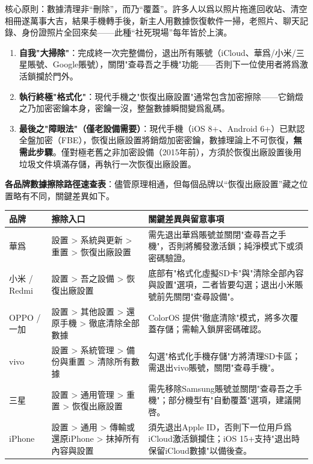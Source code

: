 


核心原則：數據清理非“刪除”，而乃“覆蓋”。許多人以爲以照片拖進回收站、清空相冊遂萬事大吉，結果手機轉手後，新主人用數據恢復軟件一掃，老照片、聊天記錄、身份證照片全回來矣——此種“社死現場”每年皆於上演。

\begin{enumerate}
  \item \textbf{自我"大掃除"}：完成終一次完整備份，退出所有賬號（iCloud、華爲/小米/三星賬號、Google賬號），關閉"查尋吾之手機"功能——否則下一位使用者將爲激活鎖攔於門外。
  \item \textbf{執行終極"格式化"}：現代手機之"恢復出廠設置"通常包含加密擦除——它銷燬之乃加密密鑰本身，密鑰一沒，整盤數據瞬間變爲亂碼。
  \item \textbf{最後之"障眼法"（僅老設備需要）}：現代手機（iOS 8+、Android 6+）已默認全盤加密（FBE），恢復出廠設置將銷燬加密密鑰，數據理論上不可恢復，\textbf{無需此步驟}。僅對極老舊之非加密設備（2015年前），方須於恢復出廠設置後用垃圾文件填滿存儲，再執行一次恢復出廠設置。
\end{enumerate}

\textbf{各品牌數據擦除路徑速查表}：儘管原理相通，但每個品牌以“恢復出廠設置”藏之位置略有不同，關鍵差異如下。

\begin{center}
\begin{tabularx}{\linewidth}{|X|X|X|}
\hline
\textbf{品牌} & \textbf{擦除入口} & \textbf{關鍵差異與留意事項} \tabularnewline
\hline
華爲 & 設置 > 系統與更新 > 重置 > 恢復出廠設置 & 需先退出華爲賬號並關閉"查尋吾之手機"，否則將觸發激活鎖；純淨模式下或須密碼驗證。 \tabularnewline
小米 / Redmi & 設置 > 吾之設備 > 恢復出廠設置 & 底部有"格式化虛擬SD卡"與"清除全部內容與設置"選項，二者皆要勾選；退出小米賬號前先關閉"查尋設備"。 \tabularnewline
OPPO / 一加 & 設置 > 其他設置 > 還原手機 > 徹底清除全部數據 & ColorOS 提供"徹底清除"模式，將多次覆蓋存儲；需輸入鎖屏密碼確認。 \tabularnewline
vivo & 設置 > 系統管理 > 備份與重置 > 清除所有數據 & 勾選"格式化手機存儲"方將清理SD卡區；需退出vivo賬號，關閉"查尋手機"。 \tabularnewline
三星 & 設置 > 通用管理 > 重置 > 恢復出廠設置 & 需先移除Samsung賬號並關閉"查尋吾之手機"；部分機型有"自動覆蓋"選項，建議開啓。 \tabularnewline
iPhone & 設置 > 通用 > 傳輸或還原iPhone > 抹掉所有內容與設置 & 須先退出Apple ID，否則下一位用戶爲iCloud激活鎖攔住；iOS 15+支持"退出時保留iCloud數據"以備後查。 \tabularnewline
\hline
\end{tabularx}
\end{center}

